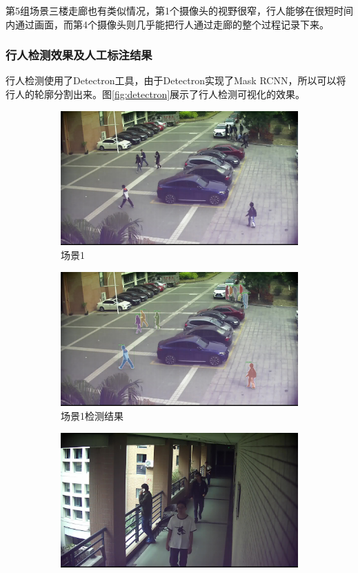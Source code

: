 第5组场景三楼走廊也有类似情况，第1个摄像头的视野很窄，行人能够在很短时间内通过画面，而第4个摄像头则几乎能把行人通过走廊的整个过程记录下来。

\subsubsection{行人检测效果及人工标注结果}

行人检测使用了Detectron工具，由于Detectron实现了Mask RCNN，所以可以将行人的轮廓分割出来。图\ref{fig:detectron}展示了行人检测可视化的效果。

\begin{figure}
\begin{subfigure}{0.5\textwidth}
\centering
\includegraphics[width=0.8\linewidth]{figure/1-2_5_151.jpg}
\caption{场景1}
\label{fig:detectron11}
\end{subfigure}
\begin{subfigure}{0.5\textwidth}
\centering
\includegraphics[width=0.8\linewidth]{figure/1-2_5_151_det.jpg}
\caption{场景1检测结果}
\label{fig:detectron12}
\end{subfigure}
\begin{subfigure}{0.5\textwidth}
\centering
\includegraphics[width=0.8\linewidth]{figure/3-7_10_394.jpg}

\end{subfigure}
\end{figure}
